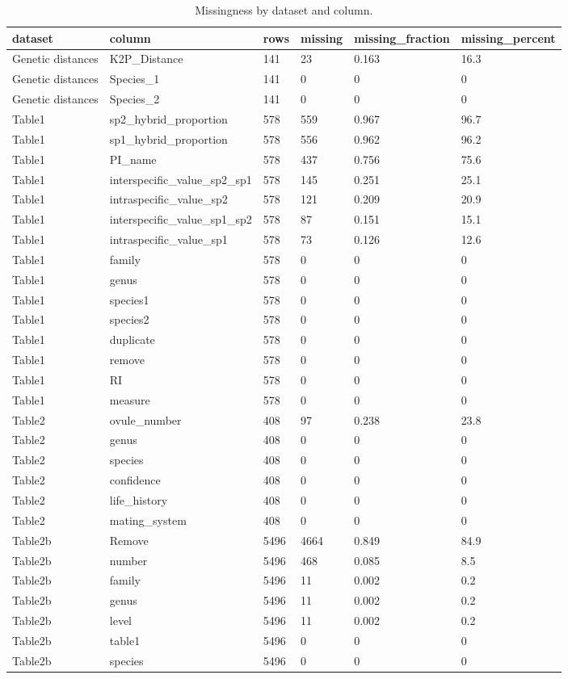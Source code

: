 \begin{table}
\caption{Missingness by dataset and column.}
\label{tab:missingness_all}
\begin{adjustbox}{max width=\textwidth}
\begin{tabular}{llllll}
\toprule
dataset & column & rows & missing & missing\_fraction & missing\_percent \\
\midrule
Genetic distances & K2P\_Distance & 141 & 23 & 0.163 & 16.3 \\
Genetic distances & Species\_1 & 141 & 0 & 0 & 0 \\
Genetic distances & Species\_2 & 141 & 0 & 0 & 0 \\
Table1 & sp2\_hybrid\_proportion & 578 & 559 & 0.967 & 96.7 \\
Table1 & sp1\_hybrid\_proportion & 578 & 556 & 0.962 & 96.2 \\
Table1 & PI\_name & 578 & 437 & 0.756 & 75.6 \\
Table1 & interspecific\_value\_sp2\_sp1 & 578 & 145 & 0.251 & 25.1 \\
Table1 & intraspecific\_value\_sp2 & 578 & 121 & 0.209 & 20.9 \\
Table1 & interspecific\_value\_sp1\_sp2 & 578 & 87 & 0.151 & 15.1 \\
Table1 & intraspecific\_value\_sp1 & 578 & 73 & 0.126 & 12.6 \\
Table1 & family & 578 & 0 & 0 & 0 \\
Table1 & genus & 578 & 0 & 0 & 0 \\
Table1 & species1 & 578 & 0 & 0 & 0 \\
Table1 & species2 & 578 & 0 & 0 & 0 \\
Table1 & duplicate & 578 & 0 & 0 & 0 \\
Table1 & remove & 578 & 0 & 0 & 0 \\
Table1 & RI & 578 & 0 & 0 & 0 \\
Table1 & measure & 578 & 0 & 0 & 0 \\
Table2 & ovule\_number & 408 & 97 & 0.238 & 23.8 \\
Table2 & genus & 408 & 0 & 0 & 0 \\
Table2 & species & 408 & 0 & 0 & 0 \\
Table2 & confidence & 408 & 0 & 0 & 0 \\
Table2 & life\_history & 408 & 0 & 0 & 0 \\
Table2 & mating\_system & 408 & 0 & 0 & 0 \\
Table2b & Remove & 5496 & 4664 & 0.849 & 84.9 \\
Table2b & number & 5496 & 468 & 0.085 & 8.5 \\
Table2b & family & 5496 & 11 & 0.002 & 0.2 \\
Table2b & genus & 5496 & 11 & 0.002 & 0.2 \\
Table2b & level & 5496 & 11 & 0.002 & 0.2 \\
Table2b & table1 & 5496 & 0 & 0 & 0 \\
Table2b & species & 5496 & 0 & 0 & 0 \\
\bottomrule
\end{tabular}
\end{adjustbox}
\end{table}
